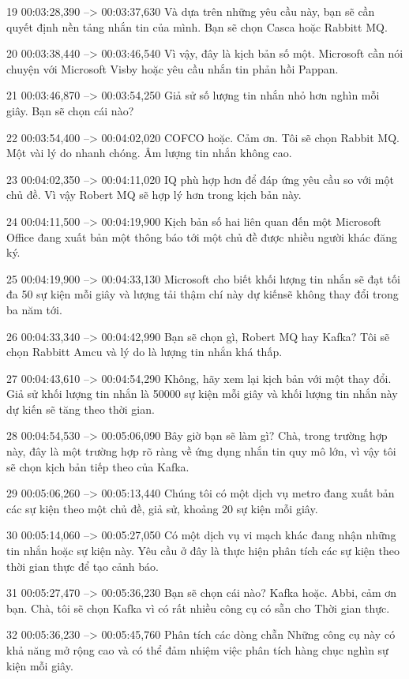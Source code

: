19
00:03:28,390 --> 00:03:37,630
Và dựa trên những yêu cầu này, bạn sẽ cần quyết định nền tảng nhắn tin của mình.  Bạn sẽ chọn Casca hoặc Rabbitt MQ.

20
00:03:38,440 --> 00:03:46,540
Vì vậy, đây là kịch bản số một.  Microsoft cần nói chuyện với Microsoft Visby hoặc yêu cầu nhắn tin phản hồi Pappan.

21
00:03:46,870 --> 00:03:54,250
Giả sử số lượng tin nhắn nhỏ hơn nghìn mỗi giây.  Bạn sẽ chọn cái nào?

22
00:03:54,400 --> 00:04:02,020
COFCO hoặc.  Cảm ơn.  Tôi sẽ chọn Rabbit MQ.  Một vài lý do nhanh chóng.  Âm lượng tin nhắn không cao.

23
00:04:02,350 --> 00:04:11,020
IQ phù hợp hơn để đáp ứng yêu cầu so với một chủ đề.  Vì vậy Robert MQ sẽ hợp lý hơn trong kịch bản này.

24
00:04:11,500 --> 00:04:19,900
Kịch bản số hai liên quan đến một Microsoft Office đang xuất bản một thông báo tới một chủ đề được nhiều người khác đăng ký.

25
00:04:19,900 --> 00:04:33,130
Microsoft cho biết khối lượng tin nhắn sẽ đạt tối đa 50 sự kiện mỗi giây và lượng tải thậm chí này dự kiến ​​sẽ không thay đổi trong ba năm tới.

26
00:04:33,340 --> 00:04:42,990
Bạn sẽ chọn gì, Robert MQ hay Kafka?  Tôi sẽ chọn Rabbitt Amcu và lý do là lượng tin nhắn khá thấp.

27
00:04:43,610 --> 00:04:54,290
Không, hãy xem lại kịch bản với một thay đổi.  Giả sử khối lượng tin nhắn là 50000 sự kiện mỗi giây và khối lượng tin nhắn này dự kiến ​​sẽ tăng theo thời gian.

28
00:04:54,530 --> 00:05:06,090
Bây giờ bạn sẽ làm gì?  Chà, trong trường hợp này, đây là một trường hợp rõ ràng về ứng dụng nhắn tin quy mô lớn, vì vậy tôi sẽ chọn kịch bản tiếp theo của Kafka.

29
00:05:06,260 --> 00:05:13,440
Chúng tôi có một dịch vụ metro đang xuất bản các sự kiện theo một chủ đề, giả sử, khoảng 20 sự kiện mỗi giây.

30
00:05:14,060 --> 00:05:27,050
Có một dịch vụ vi mạch khác đang nhận những tin nhắn hoặc sự kiện này.  Yêu cầu ở đây là thực hiện phân tích các sự kiện theo thời gian thực để tạo cảnh báo.

31
00:05:27,470 --> 00:05:36,230
Bạn sẽ chọn cái nào?  Kafka hoặc.  Abbi, cảm ơn bạn.  Chà, tôi sẽ chọn Kafka vì có rất nhiều công cụ có sẵn cho Thời gian thực.

32
00:05:36,230 --> 00:05:45,760
Phân tích các dòng chẵn  Những công cụ này có khả năng mở rộng cao và có thể đảm nhiệm việc phân tích hàng chục nghìn sự kiện mỗi giây.

